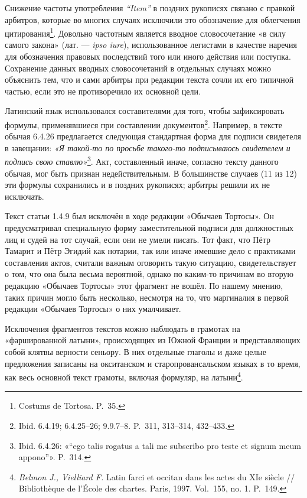 Снижение частоты употребления \emph{“Item”} в поздних рукописях связано с правкой арбитров, которые во многих случаях исключили это обозначение для облегчения цитирования\footnote{Costums de Tortosa. P.~35.}. Довольно частотным является вводное словосочетание «в силу самого закона»\emph{ }(лат. ---\emph{ }\emph{ipso iure}), использованное легистами в качестве наречия для обозначения правовых последствий того или иного действия или поступка. Сохранение данных вводных словосочетаний в отдельных случаях можно объяснить тем, что и сами арбитры при редакции текста сочли их его типичной частью, если это не противоречило их основной цели.

Латинский язык использовался составителями для того, чтобы зафиксировать формулы, применявшиеся при составлении документов\footnote{Ibid. 6.4.19; 6.4.25--26; 9.9.7--8. P.~311, 313--314, 432--433.}. Например, в тексте обычая 6.4.26 предлагается следующая стандартная форма для подписи свидетеля в завещании: \emph{«Я такой-то по просьбе такого-то подписываюсь свидетелем и подпись свою ставлю»}\footnote{Ibid. 6.4.26: «“ego talis rogatus a tali me subscribo pro teste et signum meum appono”». P.~314.}. Акт, составленный иначе, согласно тексту данного обычая, мог быть признан недействительным. В большинстве случаев (11 из 12) эти формулы сохранились и в поздних рукописях; арбитры решили их не исключать.

Текст статьи 1.4.9 был исключён в ходе редакции «Обычаев Тортосы». Он предусматривал специальную форму заместительной подписи для должностных лиц и судей на тот случай, если они не умели писать. Тот факт, что Пётр Тамарит и Пётр Эгидий как нотарии, так или иначе имевшие дело с практиками составления актов, считали важным оговорить такую ситуацию, свидетельствует о том, что она была весьма вероятной, однако по каким-то причинам во вторую редакцию «Обычаев Тортосы» этот фрагмент не вошёл. По нашему мнению, таких причин могло быть несколько, несмотря на то, что маргиналия в первой редакции «Обычаев Тортосы» о них умалчивает.

Исключения фрагментов текстов можно наблюдать в грамотах на «фаршированной латыни», происходящих из Южной Франции и представляющих собой клятвы верности сеньору. В них отдельные глаголы и даже целые предложения записаны на окситанском и старопровансальском языках в то время, как весь основной текст грамоты, включая формуляр, на латыни\footnote{\emph{Belmon J., Vielliard F.} Latin farci et occitan dans les actes du XIe siècle // Bibliothèque de l’École des chartes. Paris, 1997. Vol.~155, no. 1. P.~149.}.

